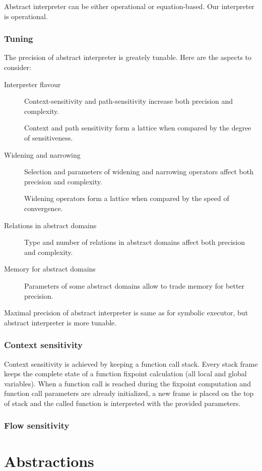 \documentclass[a4paper]{book}
\begin{document}
Abstract interpreter can be either operational or equation-based.  Our
interpreter is operational.

\subsection{Tuning}
The precision of abstract interpreter is greately tunable. Here are
the aspects to consider:
\begin{description}
\item[Interpreter flavour] Context-sensitivity and path-sensitivity
  increase both precision and complexity.

Context and path sensitivity form a lattice when compared by the
degree of sensitiveness.

\item[Widening and narrowing] Selection and parameters of widening and
  narrowing operators affect both precision and complexity.

Widening operators form a lattice when compared by the speed of
convergence.

\item[Relations in abstract domains] Type and number of relations in
  abstract domains affect both precision and complexity.
\item[Memory for abstract domains] Parameters of some abstract domains
  allow to trade memory for better precision.
\end{description}

Maximal precision of abstract interpreter is same as for symbolic
executor, but abstract interpreter is more tunable.

\subsection{Context sensitivity}
Context sensitivity is achieved by keeping a function call stack.
Every stack frame keeps the complete state of a function fixpoint
calculation (all local and global variables).  When a function call is
reached during the fixpoint computation and function call parameters
are already initialized, a new frame is placed on the top of stack and
the called function is interpreted with the provided parameters.

\subsection{Flow sensitivity}

\chapter{Abstractions}
\end{document}
